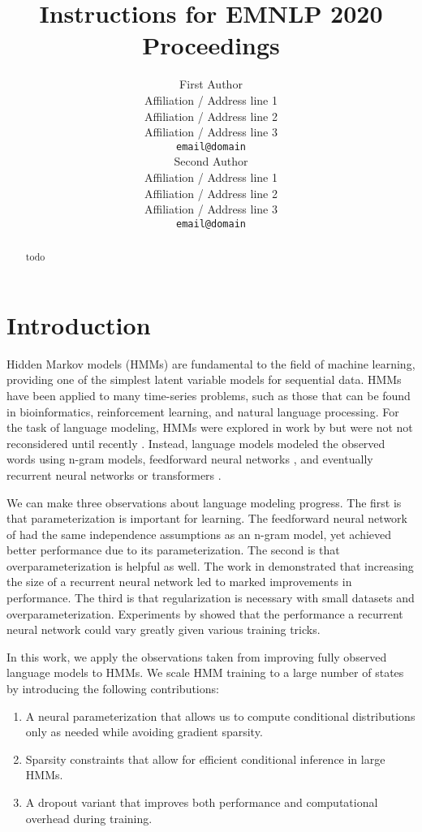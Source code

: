 \documentclass[11pt,a4paper]{article}
\title{Instructions for EMNLP 2020 Proceedings}
\author{First Author \\
  Affiliation / Address line 1 \\
  Affiliation / Address line 2 \\
  Affiliation / Address line 3 \\
  \texttt{email@domain} \\\And
  Second Author \\
  Affiliation / Address line 1 \\
  Affiliation / Address line 2 \\
  Affiliation / Address line 3 \\
  \texttt{email@domain} \\}
\date{}
\begin{document}
\maketitle
\begin{abstract}
todo
\end{abstract}

\section{Introduction}


Hidden Markov models (HMMs) are fundamental to the field of machine learning,
providing one of the simplest latent variable models for sequential data.
HMMs have been applied to many time-series problems, such as those that
can be found in bioinformatics, reinforcement learning, and natural language processing.
For the task of language modeling,
HMMs were explored in work by \citet{kuhn1994hmmlm}
but were not not reconsidered until recently \citep{krakovna2016hmm,dedieu2019learning}.
Instead, language models modeled the observed words using n-gram models, 
feedforward neural networks \citep{bengio2003nlm},
and eventually recurrent neural networks \citep{mikolov2010rnn,zaremba2014lstm,merity2017awdlstm}
or transformers \citep{radford2019language}.

We can make three observations about language modeling progress.
The first is that parameterization is important for learning.
The feedforward neural network of \citet{bengio2003nlm}
had the same independence assumptions as an n-gram model,
yet achieved better performance due to its parameterization.
The second is that overparameterization is helpful as well.
The work in \citet{zaremba2014lstm} demonstrated that increasing the size of
a recurrent neural network led to marked improvements in performance.
The third is that regularization is necessary with small
datasets and overparameterization.
Experiments by \citet{merity2017awdlstm} showed that the
performance a recurrent neural network could vary
greatly given various training tricks.

In this work, we apply the observations taken from improving fully observed
language models to HMMs.
We scale HMM training to a large number of states by introducing the following
contributions:
\begin{enumerate}
\item A neural parameterization that allows us to compute
    conditional distributions only as needed while avoiding gradient sparsity.
\item Sparsity constraints that allow for efficient conditional
    inference in large HMMs.
\item A dropout variant that improves both performance and computational overhead
    during training.
\end{enumerate}
\end{document}
